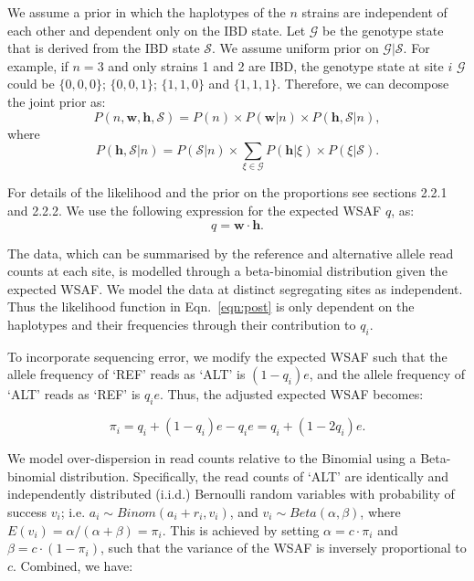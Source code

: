 \documentclass[9pt]{article}
\begin{document}
\noindent We assume a prior in which the haplotypes of the $n$ strains are independent of each other and dependent only on the IBD state. Let $\mathcal{G}$ be the genotype state that is derived from the IBD state $\mathcal{S}$. We assume uniform prior on $\mathcal{G}|\mathcal{S}$. For example, if $n=3$ and only strains 1 and 2 are IBD, the genotype state at site $i$ $\mathcal{G}$ could be $\{0,0,0\}$; $\{0,0,1\}$; $\{1,1,0\}$ and $\{1,1,1\}$. Therefore, we can decompose the joint prior as:
\begin{equation}
P(n, \mathbf{w}, \mathbf{h}, \mathcal{S}) = P(n) \times P(\mathbf{w}|n) \times P(\mathbf{h} , \mathcal{S}|n),
\end{equation}
where
\begin{equation}
P(\mathbf{h}, \mathcal{S}|n) = P(\mathcal{S}|n) \times \sum_{\xi \in \mathcal{G}} P(\mathbf{h} | \xi) \times P(\xi|\mathcal{S}).
\label{eqn:}
\end{equation}

\noindent For details of the likelihood and the prior on the proportions see \citet{Zhu2017} sections 2.2.1 and 2.2.2. We use the following expression for the expected WSAF $q$, as:
\begin{equation}
q = \mathbf{w}\cdot\mathbf{h}.\label{eqn:qij_full_sum}
\end{equation}



\noindent The data, which can be summarised by the reference and alternative allele read counts at each site, is modelled through a beta-binomial distribution given the expected WSAF.  We model the data at distinct segregating sites as independent.  Thus the likelihood function  in Eqn.~\eqref{eqn:post} is only dependent on the haplotypes  and their frequencies through their contribution to $q_{i}$.


To incorporate sequencing error, we modify the expected WSAF such that the allele frequency of `REF' reads as `ALT' is $(1 - q_i)e$, and the allele frequency of `ALT' reads as `REF' is $q_ie$. Thus, the adjusted expected WSAF becomes:

\begin{equation}
\pi_i = q_i + (1 - q_i)e - q_ie = q_i + (1 - 2q_i)e.\label{eqn:adj_q}
\end{equation}

\noindent We model over-dispersion in read counts relative to the Binomial using a Beta-binomial distribution. Specifically, the read counts of `ALT' are identically and independently distributed (i.i.d.) Bernoulli random variables with probability of success $v_i$; i.e. $a_i \sim Binom(a_i + r_i, v_i)$, and $v_i \sim Beta(\alpha, \beta)$, where $E(v_i) = \alpha/(\alpha+\beta) = \pi_{i}$. This is achieved by setting $\alpha = c\cdot \pi_{i} $ and $\beta = c\cdot (1-\pi_{i})$, such that the variance of the WSAF is inversely proportional to $c$.  Combined, we have:
\end{document}
